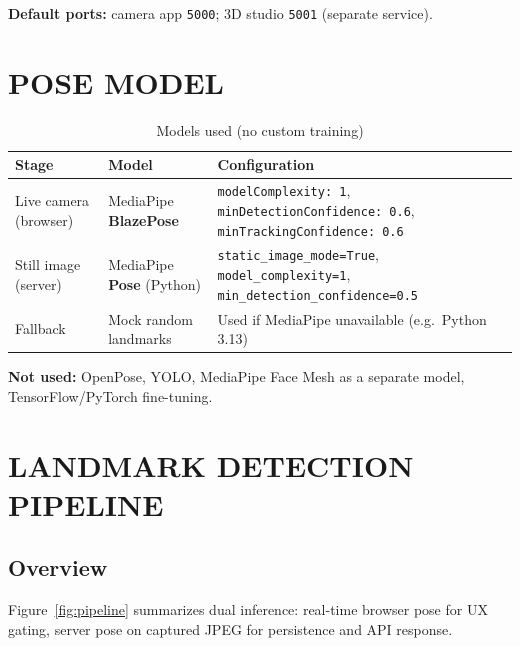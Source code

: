 \documentclass[a4paper,fleqn]{cas-sc}
\newcommand{\tblheadrow}{\rowcolor{tblhead}}
\begin{document}
\textbf{Default ports:} camera app \texttt{5000}; 3D studio \texttt{5001} (separate service).

\section{POSE MODEL}

\begin{table}[h]
\centering
\caption{Models used (no custom training)}
\label{tab:models}
\begin{tabularx}{\linewidth}{@{}llX@{}}
\tblheadrow
\textbf{Stage} & \textbf{Model} & \textbf{Configuration} \\
\midrule
Live camera (browser) & MediaPipe \textbf{BlazePose} & \texttt{modelComplexity: 1}, \texttt{minDetectionConfidence: 0.6}, \texttt{minTrackingConfidence: 0.6} \\
Still image (server) & MediaPipe \textbf{Pose} (Python) & \texttt{static\_image\_mode=True}, \texttt{model\_complexity=1}, \texttt{min\_detection\_confidence=0.5} \\
Fallback & Mock random landmarks & Used if MediaPipe unavailable (e.g.\ Python 3.13) \\
\end{tabularx}
\end{table}

\textbf{Not used:} OpenPose, YOLO, MediaPipe Face Mesh as a separate model, TensorFlow/PyTorch fine-tuning.

\section{LANDMARK DETECTION PIPELINE}

\subsection{Overview}

Figure~\ref{fig:pipeline} summarizes dual inference: real-time browser pose for UX gating, server pose on captured JPEG for persistence and API response.
\end{document}

